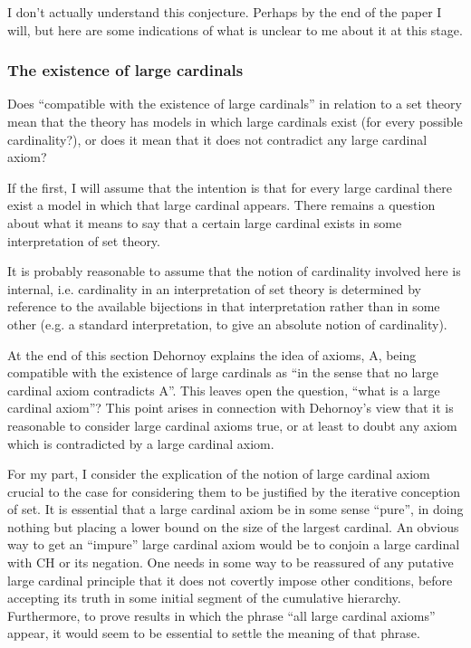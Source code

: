 I don't actually understand this conjecture.
Perhaps by the end of the paper I will, but here are some indications of what is unclear to me about it at this stage.

\subsubsection{The existence of large cardinals}

Does ``compatible with the existence of large cardinals'' in relation to a set theory mean that the theory has models in which large cardinals exist (for every possible cardinality?), or does it mean that it does not contradict any large cardinal axiom?

If the first, I will assume that the intention is that for every large cardinal there exist a model in which that large cardinal appears.
There remains a question about what it means to say that a certain large cardinal exists in some interpretation of set theory.

It is probably reasonable to assume that the notion of cardinality involved here is internal, i.e. cardinality in an interpretation of set theory is determined by reference to the available bijections in that interpretation rather than in some other (e.g. a standard interpretation, to give an absolute notion of cardinality).

At the end of this section Dehornoy explains the idea of axioms, A, being compatible with the existence of large cardinals as ``in the sense that no large cardinal axiom contradicts A''.
This leaves open the question, ``what is a large cardinal axiom''?
This point arises in connection with Dehornoy's view that it is reasonable to consider large cardinal axioms true, or at least to doubt any axiom which is contradicted by a large cardinal axiom.

For my part, I consider the explication of the notion of large cardinal axiom crucial to the case for considering them to be justified by the iterative conception of set.
It is essential that a large cardinal axiom be in some sense ``pure'', in doing nothing but placing a lower bound on the size of the largest cardinal.
An obvious way to get an ``impure'' large cardinal axiom would be to conjoin a large cardinal with CH or its negation.
One needs in some way to be reassured of any putative large cardinal principle that it does not covertly impose other conditions, before accepting its truth in some initial segment of the cumulative hierarchy.
Furthermore, to prove results in which the phrase ``all large cardinal axioms'' appear, it would seem to be essential to settle the meaning of that phrase.

